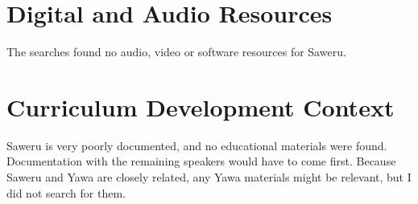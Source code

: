 \documentclass[12pt]{article}
\begin{document}
\section{Digital and Audio Resources}
The searches found no audio, video or software resources for Saweru.

\section{Curriculum Development Context}
Saweru is very poorly documented, and no educational materials were found. Documentation with the remaining speakers would have to come first. Because Saweru and Yawa are closely related, any Yawa materials might be relevant, but I did not search for them.
\end{document}
